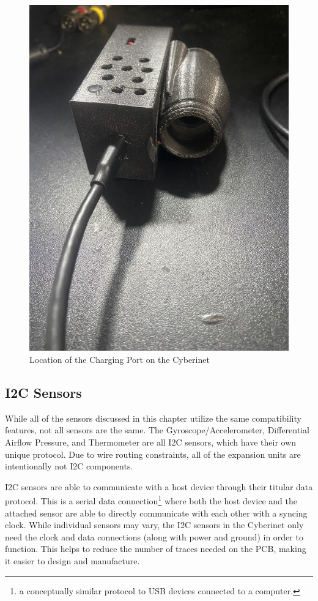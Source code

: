\begin{figure}
    \centering
    \includegraphics[scale=0.08, angle=270]{diagrams/builtUnits/chargingPort.JPG}
    \caption{Location of the Charging Port on the Cyberinet}
    \label{fig:chargePortLocation}
\end{figure}


\subsection{I2C Sensors}
While all of the sensors discussed in this chapter utilize the same compatibility features, not all sensors are the same. The Gyroscope/Accelerometer, Differential Airflow Pressure, and Thermometer are all I2C sensors, which have their own unique protocol. Due to wire routing constraints, all of the expansion units are intentionally not I2C components.

I2C sensors are able to communicate with a host device through their titular data protocol. This is a serial data connection\footnote{a conceptually similar protocol to USB devices connected to a computer.} where both the host device and the attached sensor are able to directly communicate with each other with a syncing clock. While individual sensors may vary, the I2C sensors in the Cyberinet only need the clock and data connections (along with power and ground) in order to function. This helps to reduce the number of traces needed on the PCB, making it easier to design and manufacture.

